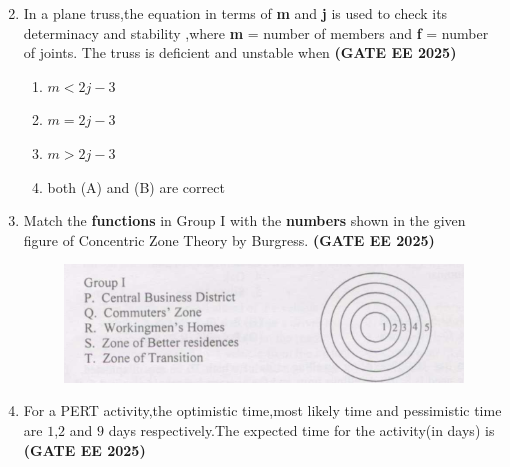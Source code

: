 \documentclass[journal,12pt,onecolumn]{IEEEtran}
\theoremstyle{remark}
\begin{document}
\begin{enumerate}
\begin{enumerate}
\begin{multicols}{2}
\end{multicols}
\end{enumerate}
\item In a plane truss,the equation in terms of \textbf{m} and \textbf{j} is used to check its determinacy and stability ,where \textbf{m} = number of members and \textbf{f} = number of joints. The truss is deficient and unstable when \hfill \textbf{(GATE EE 2025)}
\begin{enumerate}
    \item $m<2j-3$
    \item $m = 2j-3$
    \item $m > 2j-3$
    \item both (A) and (B) are correct
\end{enumerate}
\item Match the \textbf{functions} in Group I with the \textbf{numbers} shown in the given figure of Concentric Zone Theory by Burgress. \hfill \textbf{(GATE EE 2025)}
\newline
\begin{figure}[h]
    \centering
    \includegraphics[width=0.6\linewidth]{figs/fig2.png}
    \caption{}
    \label{fig2}
\end{figure}
\begin{enumerate}
\end{enumerate}
\item For a PERT activity,the optimistic time,most likely time and pessimistic time are $1$,$2$ and $9$ days respectively.The expected time for the activity(in days) is \hfill \textbf{(GATE EE 2025)}
\begin{enumerate}
\end{enumerate}
\end{enumerate}
\end{document}
